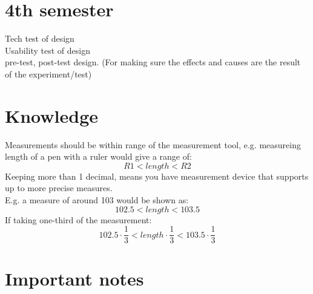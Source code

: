 \documentclass{article}
\begin{document}
\section{4th semester}
Tech test of design\\
Usability test of design\\
pre-test, post-test design. (For making sure the effects and causes are the result of the experiment/test)\\

\section{Knowledge}
Measurements should be within range of the measurement tool, e.g. measureing length of a pen with a ruler would give a range of:
$$R1 < length < R2$$
Keeping more than 1 decimal, means you have measurement device that supports up to more precise measures. \\
E.g. a measure of around 103 would be shown as:
$$ 102.5 < length < 103.5 $$
If taking one-third of the measurement:
$$ 102.5 \cdot \frac{1}{3} < length \cdot \frac{1}{3} < 103.5 \cdot \frac{1}{3}$$
\section{Important notes}
\end{document}

